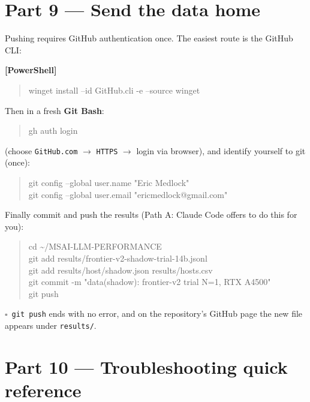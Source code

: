 \documentclass[11pt]{article}
\newenvironment{cmdblock}{\begin{quote}\small\begin{ttfamily}}{\end{ttfamily}\end{quote}}
\newcommand{\checkbox}{$\square$~}
\begin{document}
\section*{Part 9 --- Send the data home}

Pushing requires GitHub authentication once. The easiest route is the GitHub CLI:

\textbf{[PowerShell]}
\begin{cmdblock}
winget install --id GitHub.cli -e --source winget
\end{cmdblock}

Then in a fresh \textbf{Git Bash}:
\begin{cmdblock}
gh auth login
\end{cmdblock}
(choose \texttt{GitHub.com} $\rightarrow$ \texttt{HTTPS} $\rightarrow$ login via
browser), and identify yourself to git (once):
\begin{cmdblock}
git config --global user.name "Eric Medlock" \\
git config --global user.email "ericmedlock@gmail.com"
\end{cmdblock}

Finally commit and push the results (Path A: Claude Code offers to do this for you):
\begin{cmdblock}
cd \textasciitilde/MSAI-LLM-PERFORMANCE \\
git add results/frontier-v2-shadow-trial-14b.jsonl \\
git add results/host/shadow.json results/hosts.csv \\
git commit -m "data(shadow): frontier-v2 trial N=1, RTX A4500" \\
git push
\end{cmdblock}

\checkbox \texttt{git push} ends with no error, and on the repository's GitHub
page the new file appears under \texttt{results/}.

\section*{Part 10 --- Troubleshooting quick reference}
\end{document}
